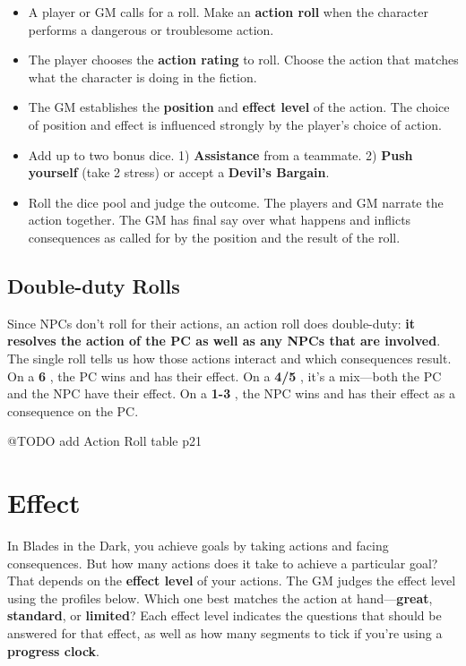 \documentclass[11pt,oneside]{book}
\newcommand{\gameterm}[1]{\textbf{#1}}
\begin{document}
\begin{itemize}
	\item A player or GM calls for a roll. Make an \textbf{action roll} when the character performs a dangerous or troublesome action.
	\item The player chooses the \textbf{action rating} to roll. Choose the action that matches what the character is doing in the fiction.
	\item The GM establishes the \textbf{position} and \textbf{effect level} of the action. The choice of position and effect is influenced strongly by the player’s choice of action.
	\item Add up to two bonus dice. 1) \textbf{Assistance} from a teammate. 2) \textbf{Push yourself} (take 2 stress) or accept a \textbf{Devil’s Bargain}.
	\item Roll the dice pool and judge the outcome. The players and GM narrate the action together. The GM has final say over what happens and inflicts consequences as called for by the position and the result of the roll.
\end{itemize}

\section{Double-duty Rolls}

Since NPCs don’t roll for their actions, an action roll does double-duty: \textbf{it resolves the action of the PC as well as any NPCs that are involved}. The single roll tells us how those actions interact and which consequences result. On a \gameterm{6} , the PC wins and has their effect. On a \gameterm{4/5} , it’s a mix---both the PC and the NPC have their effect. On a \gameterm{1-3} , the NPC wins and has their effect as a consequence on the PC.

@TODO add Action Roll table p21

\chapter{Effect}

In Blades in the Dark, you achieve goals by taking actions and facing consequences. But how many actions does it take to achieve a particular goal? That depends on the \textbf{effect level} of your actions. The GM judges the effect level using the profiles below. Which one best matches the action at hand---\textbf{great}, \textbf{standard}, or \textbf{limited}? Each effect level indicates the questions that should be answered for that effect, as well as how many segments to tick if you’re using a \textbf{progress clock}.
\end{document}

